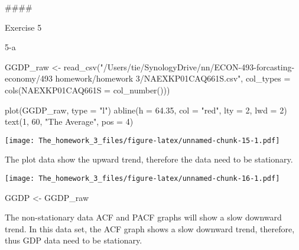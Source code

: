 \documentclass[
]{article}
\newenvironment{Shaded}{\begin{snugshade}}{\end{snugshade}}
\newcommand{\AttributeTok}[1]{\textcolor[rgb]{0.77,0.63,0.00}{#1}}
\newcommand{\DecValTok}[1]{\textcolor[rgb]{0.00,0.00,0.81}{#1}}
\newcommand{\FloatTok}[1]{\textcolor[rgb]{0.00,0.00,0.81}{#1}}
\newcommand{\FunctionTok}[1]{\textcolor[rgb]{0.00,0.00,0.00}{#1}}
\newcommand{\NormalTok}[1]{#1}
\newcommand{\OtherTok}[1]{\textcolor[rgb]{0.56,0.35,0.01}{#1}}
\newcommand{\SpecialCharTok}[1]{\textcolor[rgb]{0.00,0.00,0.00}{#1}}
\newcommand{\StringTok}[1]{\textcolor[rgb]{0.31,0.60,0.02}{#1}}
\begin{document}
\#\#\#\#

Exercise 5

5-a

\begin{Shaded}
\begin{Highlighting}[]
\NormalTok{GGDP\_raw }\OtherTok{\textless{}{-}} \FunctionTok{read\_csv}\NormalTok{(}\StringTok{"/Users/tie/SynologyDrive/nn/ECON{-}493{-}forcasting{-}economy/493 homework/homework 3/NAEXKP01CAQ661S.csv"}\NormalTok{, }\AttributeTok{col\_types =} \FunctionTok{cols}\NormalTok{(}\AttributeTok{NAEXKP01CAQ661S =} \FunctionTok{col\_number}\NormalTok{()))}

\FunctionTok{plot}\NormalTok{(GGDP\_raw, }\AttributeTok{type =} \StringTok{"l"}\NormalTok{)}
\FunctionTok{abline}\NormalTok{(}\AttributeTok{h =} \FloatTok{64.35}\NormalTok{, }\AttributeTok{col =} \StringTok{"red"}\NormalTok{, }\AttributeTok{lty =} \DecValTok{2}\NormalTok{, }\AttributeTok{lwd =} \DecValTok{2}\NormalTok{)}
\FunctionTok{text}\NormalTok{(}\DecValTok{1}\NormalTok{, }\DecValTok{60}\NormalTok{, }\StringTok{"The Average"}\NormalTok{, }\AttributeTok{pos =} \DecValTok{4}\NormalTok{)}
\end{Highlighting}
\end{Shaded}

\texttt{[image: The\_homework\_3\_files/figure-latex/unnamed-chunk-15-1.pdf]}

The plot data show the upward trend, therefore the data need to be
stationary.

\begin{Shaded}
\end{Shaded}

\texttt{[image: The\_homework\_3\_files/figure-latex/unnamed-chunk-16-1.pdf]}

\begin{Shaded}
\begin{Highlighting}[]
\NormalTok{GGDP }\OtherTok{\textless{}{-}}\NormalTok{ GGDP\_raw}
\end{Highlighting}
\end{Shaded}

The non-stationary data ACF and PACF graphs will show a slow downward
trend. In this data set, the ACF graph shows a slow downward trend,
therefore, thus GDP data need to be stationary.
\end{document}

